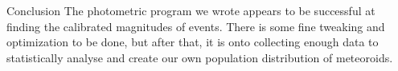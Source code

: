 \documentclass[final]{beamer}
\newlength{\twocolwid}
\begin{document}
\begin{frame}[t]
\begin{columns}[t]
\begin{column}{\twocolwid}
\begin{block}{Conclusion}
The photometric program we wrote appears to be successful at finding the calibrated magnitudes of events. There is some fine tweaking and optimization to be done, but after that, it is onto collecting enough data to statistically analyse and create our own population distribution of meteoroids. 

\end{block}

















\end{column}
\end{columns}
\end{frame}
\end{document}
